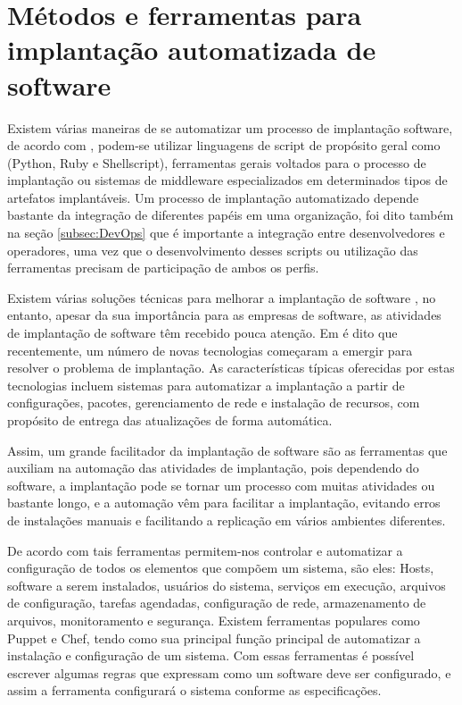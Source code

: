 \section{Métodos e ferramentas para implantação automatizada de software}
\label{subsec:metodoseferramentas}

Existem várias maneiras de se automatizar um processo de implantação software,
de acordo com \cite{leo2014}, podem-se utilizar linguagens de script de propósito
geral como (Python, Ruby e Shellscript), ferramentas gerais voltados para o processo
de implantação ou sistemas de middleware especializados em determinados tipos de artefatos implantáveis.
Um processo de implantação automatizado depende bastante da integração de diferentes papéis
em uma organização, foi dito também na seção \ref{subsec:DevOps} que é importante a
integração entre desenvolvedores e operadores, uma vez que o desenvolvimento desses
scripts ou utilização das ferramentas precisam de participação de ambos os perfis.

Existem várias soluções técnicas  para melhorar a implantação de software \cite{5741269},
no entanto, apesar da sua importância para as empresas de software, as atividades
de implantação de software têm recebido pouca atenção. Em \cite{deployment1998}
é dito que recentemente, um número de novas tecnologias começaram a emergir para
resolver o problema de implantação. As características típicas oferecidas por
estas tecnologias incluem sistemas para automatizar a implantação a partir de
configurações, pacotes, gerenciamento de rede e instalação de recursos, com
propósito de entrega das atualizações de forma automática.

Assim, um grande facilitador da implantação de software são as ferramentas que auxiliam na
automação das atividades de implantação, pois dependendo do software, a implantação
pode se tornar um processo com muitas atividades ou bastante longo, e a automação
vêm para facilitar a implantação, evitando erros de instalações manuais e facilitando a replicação em
vários ambientes diferentes.

De acordo com \cite{6265084} tais ferramentas permitem-nos controlar e automatizar
a configuração de todos os elementos que compõem um sistema, são eles: Hosts, software a serem instalados,
usuários do sistema, serviços em execução, arquivos de configuração, tarefas agendadas,
configuração de rede, armazenamento de arquivos, monitoramento e segurança. Existem
ferramentas populares como Puppet e Chef, tendo como sua principal função principal
de automatizar a instalação e configuração de um sistema. Com essas ferramentas é
possível escrever algumas regras que expressam como um software deve ser configurado,
e assim a ferramenta configurará o sistema conforme as especificações.

